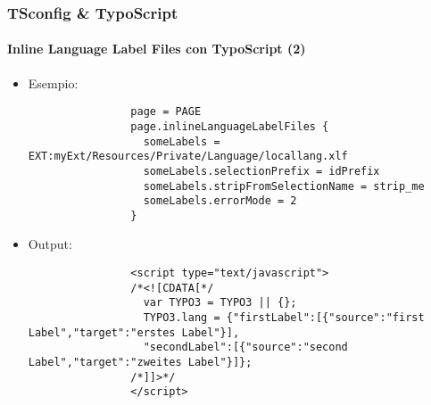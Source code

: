 \begin{frame}[fragile]
	\frametitle{TSconfig \& TypoScript}
	\framesubtitle{Inline Language Label Files con TypoScript (2)}

	\lstset{basicstyle=\tiny\ttfamily}

	\begin{itemize}

		\item Esempio:

			\begin{lstlisting}
				page = PAGE
				page.inlineLanguageLabelFiles {
				  someLabels = EXT:myExt/Resources/Private/Language/locallang.xlf
				  someLabels.selectionPrefix = idPrefix
				  someLabels.stripFromSelectionName = strip_me
				  someLabels.errorMode = 2
				}
			\end{lstlisting}

		\item Output:

			\begin{lstlisting}
				<script type="text/javascript">
				/*<![CDATA[*/
				  var TYPO3 = TYPO3 || {};
				  TYPO3.lang = {"firstLabel":[{"source":"first Label","target":"erstes Label"}],
				  "secondLabel":[{"source":"second Label","target":"zweites Label"}]};
				/*]]>*/
				</script>
			\end{lstlisting}

	\end{itemize}

\end{frame}

